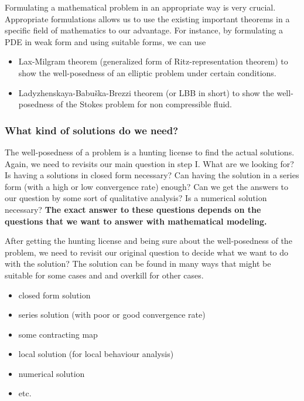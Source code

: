 \begin{summary}
	Formulating a mathematical problem in an appropriate way is very crucial. Appropriate formulations allows us to use the existing important theorems in a specific field of mathematics to our advantage. For instance, by formulating a PDE in weak form and using suitable forms, we can use
	\begin{itemize}
		\item Lax-Milgram theorem (generalized form of Ritz-representation theorem) to show the well-posedness of an elliptic problem under certain conditions.
		\item Ladyzhenskaya-Babuška-Brezzi theorem (or LBB in short) to show the well-posedness of the Stokes problem for non compressible fluid.
	\end{itemize}
\end{summary}


\subsubsection{What kind of solutions do we need?}
The well-posedness of a problem is a hunting license to find the actual solutions. Again, we need to revisits our main question in step I. What are we looking for? Is having a solutions in closed form necessary? Can having the solution in a series form (with a high or low convergence rate) enough? Can we get the answers to our question by some sort of qualitative analysis? Is a numerical solution necessary? \textbf{The exact answer to these questions depends on the questions that we want to answer with mathematical modeling.}

\begin{summary}
	After getting the hunting license and being sure about the well-posedness of the problem, we need to revisit our original question to decide what we want to do with the solution? The solution can be found in many ways that might be suitable for some cases and and overkill for other cases.
	\begin{itemize}
		\item closed form solution
		\item series solution (with poor or good convergence rate)
		\item some contracting map 
		\item local solution (for local behaviour analysis)
		\item numerical solution
		\item etc.
	\end{itemize}
\end{summary}

